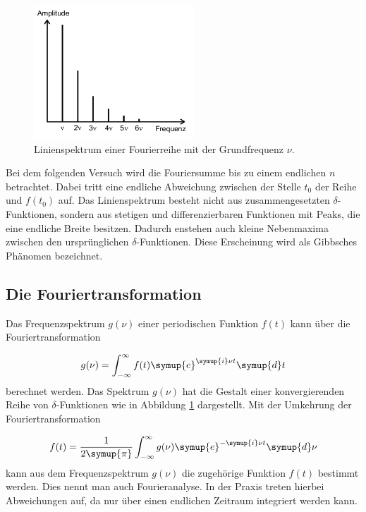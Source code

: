\begin{figure}
  \centering
  \includegraphics[height = 5cm]{Linienspektrum.png}
  \caption{Linienspektrum einer Fourierreihe mit der Grundfrequenz $\nu$\cite{anleitung}.}
  \label{fig:Linienspektrum}
\end{figure}


Bei dem folgenden Versuch wird die Fouriersumme bis zu einem endlichen
$n$ betrachtet. Dabei tritt eine endliche Abweichung zwischen der Stelle $t_0$
der Reihe und $f(t_0)$ auf. Das Linienspektrum besteht nicht aus
zusammengesetzten $\delta$-Funktionen, sondern aus stetigen und
differenzierbaren Funktionen mit Peaks, die eine endliche Breite besitzen.
Dadurch enstehen auch kleine Nebenmaxima zwischen den ursprünglichen
$\delta$-Funktionen.
Diese Erscheinung wird als Gibbsches Phänomen bezeichnet.

\subsection{Die Fouriertransformation}

Das Frequenzspektrum $g(\nu)$ einer periodischen Funktion $f(t)$ kann über
die Fouriertransformation

\begin{equation}
  g(\nu) = \int_{-\infty}^{\infty} f(t) \symup{e}^{\symup{i}\nu t} \symup{d}t
\end{equation}
berechnet werden.
Das Spektrum $g(\nu)$ hat die Gestalt einer konvergierenden Reihe von
$\delta$-Funktionen wie in Abbildung \ref{fig:Linienspektrum} dargestellt.
Mit der Umkehrung der Fouriertransformation

\begin{equation}
  f(t) = \frac{1}{2\symup{\pi}} \int_{-\infty}^{\infty} g(\nu) \symup{e}^{
  -\symup{i}\nu t} \symup{d} \nu
\end{equation}
kann aus dem Frequenzspektrum $g(\nu)$ die zugehörige Funktion $f(t)$ bestimmt
werden. Dies nennt man auch Fourieranalyse.
In der Praxis treten hierbei Abweichungen auf, da nur über einen endlichen
Zeitraum integriert werden kann.
